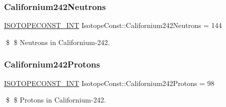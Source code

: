 \subsubsection{\texorpdfstring{Californium242\+Neutrons}{Californium242Neutrons}}
{\footnotesize\ttfamily \mbox{\hyperlink{group___isotope_const-_macros_ga5f18360b3e99483a35c32d789e62621c}{I\+S\+O\+T\+O\+P\+E\+C\+O\+N\+S\+T\+\_\+\+I\+NT}} Isotope\+Const\+::\+Californium242\+Neutrons = 144}

\$ \$ Neutrons in Californium-\/242. \mbox{\label{group___isotope_const-_californium-_cf242_gaba10a757aeac78ea2b4ff94ab5a1beaf}} 
\subsubsection{\texorpdfstring{Californium242\+Protons}{Californium242Protons}}
{\footnotesize\ttfamily \mbox{\hyperlink{group___isotope_const-_macros_ga5f18360b3e99483a35c32d789e62621c}{I\+S\+O\+T\+O\+P\+E\+C\+O\+N\+S\+T\+\_\+\+I\+NT}} Isotope\+Const\+::\+Californium242\+Protons = 98}

\$ \$ Protons in Californium-\/242. 